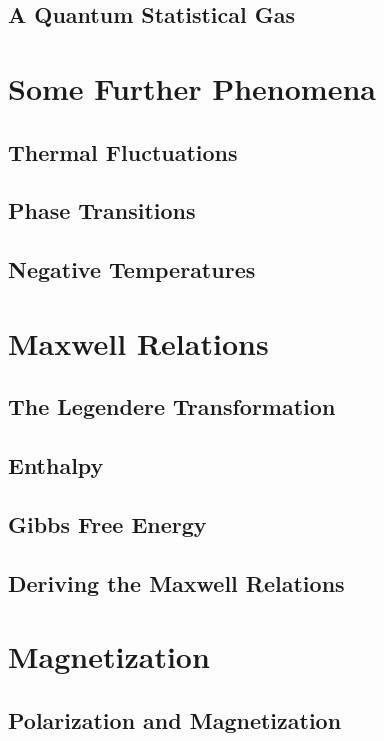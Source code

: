 \documentclass[11pt,a4paper]{article}
\theoremstyle{theorem}
\theoremstyle{definition}
\theoremstyle{definition}
\theoremstyle{remark}
\theoremstyle{definition}
\theoremstyle{remark}
\begin{document}
\subsection{A Quantum Statistical Gas}

\section{Some Further Phenomena} 

\subsection{Thermal Fluctuations}

\subsection{Phase Transitions}

\subsection{Negative Temperatures}

\section{Maxwell Relations}

\subsection{The Legendere Transformation}

\subsection{Enthalpy}

\subsection{Gibbs Free Energy}

\subsection{Deriving the Maxwell Relations}

\section{Magnetization}

\subsection{Polarization and Magnetization}
\end{document}
